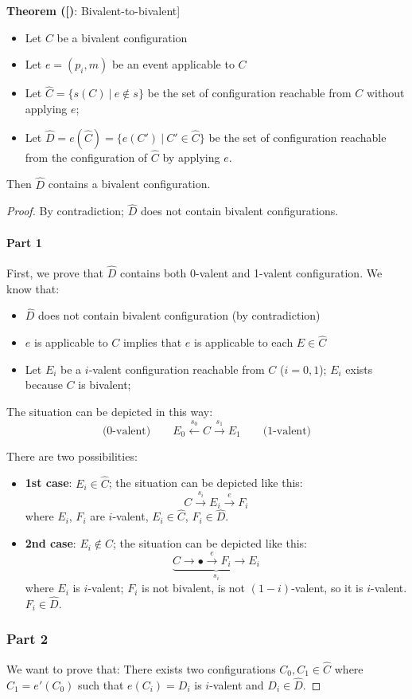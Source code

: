 \documentclass[12pt]{article}
\newcommand{\BI}{\begin{itemize}}
\newcommand{\EI}{\end{itemize}}
\newenvironment{lemma}[1]{\textbf{Theorem (#1)}: }{\medskip}
\begin{document}
\begin{lemma}[Bivalent-to-bivalent]~
\BI
\item Let $C$ be a bivalent configuration
\item Let $e=(p_i,m)$ be an event applicable to $C$
\item Let $\hat{C} = \{ s(C) ~|~ e \not\in s \}$ be the set of configuration reachable from $C$ without applying $e$;
\item Let $\hat{D} = e(\hat{C}) = \{ e(C') ~|~ C' \in \hat{C} \}$ be the set of configuration reachable from the configuration
  of $\hat{C}$ by applying $e$.
\EI
Then $\hat{D}$ contains a bivalent configuration.
\end{lemma}

\begin{proof}
By contradiction; $\hat{D}$ does not contain bivalent configurations.

\paragraph{Part 1}
First, we prove that $\hat{D}$ contains both 0-valent and 1-valent configuration. We know that:
\BI
\item $\hat{D}$ does not contain bivalent configuration (by contradiction)
\item $e$ is applicable to $C$ implies that $e$ is applicable to each $E \in \hat{C}$
\item Let $E_i$ be a $i$-valent configuration reachable from $C$ ($i=0,1$); $E_i$ exists
  because $C$ is bivalent;
\EI
The situation can be depicted in this way:
\[
  \text{(0-valent)} \qquad E_0 \xleftarrow{s_0} C \xrightarrow{s_1} E_1 \qquad \text{(1-valent)}
\]

There are two possibilities:
\BI
\item {\bf 1st case}:  
$E_i \in \hat{C}$; the situation can be depicted like this:
\[
  C \xrightarrow{s_i} E_i \xrightarrow{e} F_i
\]
where $E_i$, $F_i$ are $i$-valent, $E_i \in \hat{C}$, $F_i \in \hat{D}$.

\item {\bf 2nd case}:
$E_i \not\in \hat{C}$; the situation can be depicted like this:
\[
  \underbrace{ C \rightarrow \bullet \xrightarrow{e} F_i \rightarrow E_i}_{s_i}
\]
where $E_i$ is $i$-valent; $F_i$ is not bivalent, is not $(1-i)$-valent, so it is
$i$-valent. $F_i \in \hat{D}$.
\EI 

\newpage

\subsubsection*{Part 2}
We want to prove that:
  There exists two configurations $C_0, C_1 \in \hat{C}$ where $C_1=e'(C_0)$ such that
  $e(C_i)=D_i$ is $i$-valent and $D_i \in \hat{D}$.


\end{proof}
\end{document}

